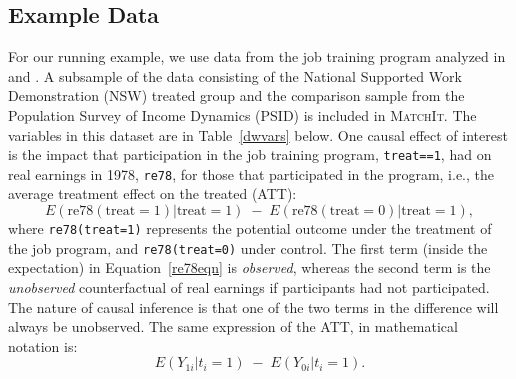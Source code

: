 \documentclass[oneside,letterpaper,titlepage]{article}
\newcommand{\MatchIt}{\textsc{MatchIt}}
\begin{document}
\subsection{Example Data}
\label{subsec:lalonde}

For our running example, we use data from the job training program
analyzed in \citet{lalonde86} and \citet{DehWah99}.  A subsample of
the data consisting of the National Supported Work Demonstration (NSW)
treated group and the comparison sample from the Population Survey of
Income Dynamics (PSID) is included in \MatchIt.  The variables in this
dataset are in Table~\ref{dwvars} below.  One causal effect of
interest is the impact that participation in the job training program,
\texttt{treat==1}, had on real earnings in 1978, \texttt{re78}, for
those that participated in the program, i.e., the average treatment
effect on the treated (ATT):
\begin{equation}\label{re78eqn}
  E(\text{re78}(\text{treat}=1) | \text{treat}=1)\; - \; 
  E(\text{re78}(\text{treat}=0) | \text{treat}=1),
\end{equation}
where \texttt{re78(treat=1)} represents the potential outcome under
the treatment of the job program, and \texttt{re78(treat=0)} under
control.  The first term (inside the expectation) in
Equation~\ref{re78eqn} is \emph{observed}, whereas the second term is
the \emph{unobserved} counterfactual of real earnings if participants
had not participated.  The nature of causal inference is that one of
the two terms in the difference will always be unobserved.  The same
expression of the ATT, in mathematical notation is:
\begin{equation}
  E(Y_{1i} | t_i=1 ) \; - \; E(Y_{0i} | t_i=1).
\end{equation}
\end{document}

